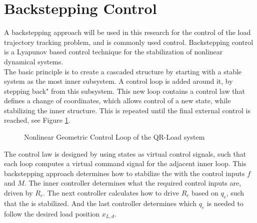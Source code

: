 \newpage
\section{Backstepping Control}\label{sec:con.back}
A backstepping approach will be used in this research for the control of the load trajectory tracking problem, and is commonly used  control\cite{Mahony2012}. Backstepping control is a Lyapunov based control technique for the stabilization of nonlinear dynamical systems. \\
The basic principle is to create a cascaded structure by starting with a stable system as the most inner subsystem. A control loop is added around it, by stepping back" from this subsystem. This new loop contains a control law that defines a change of coordinates, which allows control of a new state, while stabilizing the inner structure.
This is repeated until the final external control is reached, see Figure \ref{fig:con.loop}.
\begin{figure}[h!]
	\centering
	\caption{Nonlinear Geometric Control Loop of the QR-Load system \cite{Sreenath2013c}\label{fig:con.loop}}
\end{figure}	

The control law is designed by using states as virtual control signals, such that each loop computes a virtual command signal for the adjacent inner loop. 
This backstepping approach determines how to stabilize the  with the control inputs $ f $ and $ M $. 
The inner controller determines what the required control inputs are, driven by $ R_c $.  
The next controller calculates how to drive $ R_c $ based on $ q_c $, such that the  is stabilized.
And the last controller determines which $ q_c $ is needed to follow the desired load position $ x_{L,d} $.

